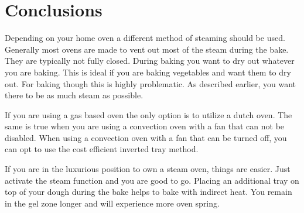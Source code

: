 \section{Conclusions}

\begin{table}[]
  \centering
  \caption{An overview of ovens and their different baking methods}
\end{table}

Depending on your home oven a different method
of steaming should be used. Generally most ovens
are made to vent out most of the steam during the
bake. They are typically not fully closed. During
baking you want to dry out whatever you are baking.
This is ideal if you are baking vegetables and
want them to dry out. For baking though this is
highly problematic. As described earlier, you
want there to be as much steam as possible.

If you are using a gas based oven the only option
is to utilize a dutch oven. The same is true when you
are using a convection oven with a fan that
can not be disabled. When using a convection
oven with a fan that can be turned off, you can
opt to use the cost efficient inverted tray
method.

If you are in the luxurious
position to own a steam oven, things are easier.
Just activate the steam function and you are
good to go. Placing an additional tray on top of your
dough during the bake helps to bake with indirect
heat. You remain in the gel zone longer and
will experience more oven spring.